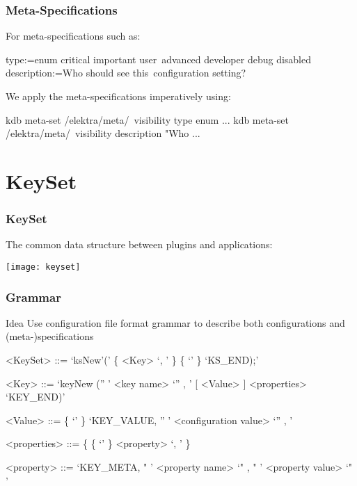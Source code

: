 \begin{frame}[fragile]
	\frametitle{Meta-Specifications}
	For meta-specifications such as:

	\small
	\begin{code}
	[visibility]
	type:=enum critical important user\
	      advanced developer debug disabled
	description:=Who should see this\
	     configuration setting?
	\end{code}

	\vspace{1cm}

	We apply the meta-specifications imperatively using:

	\begin{code}[language=bash,morekeywords={meta-set}]
	kdb meta-set /elektra/meta/\
		visibility type enum ...
	kdb meta-set /elektra/meta/\
		visibility description "Who ...
	\end{code}
\end{frame}

\section{KeySet}

\begin{frame}
	\frametitle{KeySet}

	The common data structure between plugins and applications:
	\vspace{1cm}

	\texttt{[image: keyset]}
\end{frame}

\begin{frame}[fragile]
	\frametitle{Grammar}
	\begin{alertblock}{Idea}
	Use configuration file format grammar to describe both configurations and (meta-)specifications
	\end{alertblock}

	\begin{grammar}
	<KeySet> ::= \lq ksNew'\WhiteSpace(' \{ <Key> \lq , \LineBreak'  \}  \{ \lq\WhiteSpace' \} \lq KS\_END);'

	<Key> ::= \lq keyNew \WhiteSpace ('' ' <key name> \lq ''  , \LineBreak' [ <Value> ] <properties> \lq KEY_END)'

	<Value> ::=  \{ \lq\WhiteSpace' \} \lq KEY\_VALUE, \WhiteSpace '' ' <configuration value> \lq ''  , \LineBreak'

	<properties> ::= \{ \{ \lq\WhiteSpace' \} <property> \lq , \LineBreak' \}

	<property> ::=  \lq KEY\_META, \WhiteSpace " ' <property name> \lq "  , \WhiteSpace " ' <property value> \lq " '
	\end{grammar}
\end{frame}

